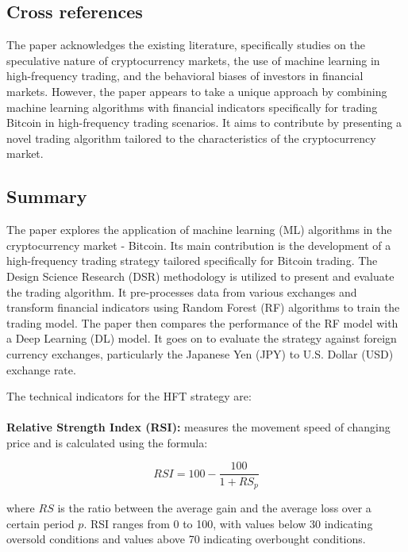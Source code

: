 \documentclass{article}
\begin{document}
    \subsection*{Cross references}
    The paper acknowledges the existing literature, specifically studies on the speculative nature of cryptocurrency markets, the use of machine learning in high-frequency trading, and the behavioral biases of investors in financial markets. However, the paper appears to take a unique approach by combining machine learning algorithms with financial indicators specifically for trading Bitcoin in high-frequency trading scenarios. It aims to contribute by presenting a novel trading algorithm tailored to the characteristics of the cryptocurrency market. 
    
  \subsection*{Summary}

    The paper explores the application of machine learning (ML) algorithms in the cryptocurrency market - Bitcoin. Its main contribution is the development of a high-frequency trading strategy tailored specifically for Bitcoin trading. The Design Science Research (DSR) methodology is utilized to present and evaluate the trading algorithm. It pre-processes data from various exchanges and transform financial indicators using Random Forest (RF) algorithms to train the trading model. The paper then compares the performance of the RF model with a Deep Learning (DL) model. It goes on to evaluate the strategy against foreign currency exchanges, particularly the Japanese Yen (JPY) to U.S. Dollar (USD) exchange rate.
    
    The technical indicators for the HFT strategy are:\\\\ 
    
    \textbf{Relative Strength Index (RSI):}
    measures the movement speed of changing price and is calculated using the formula:
    
    \[
    RSI = 100 - \frac{100}{1 + RS_p}
    \]
    
    where \(RS\) is the ratio between the average gain and the average loss over a certain period \(p\). RSI ranges from 0 to 100, with values below 30 indicating oversold conditions and values above 70 indicating overbought conditions.\\\\
    
\end{document}
